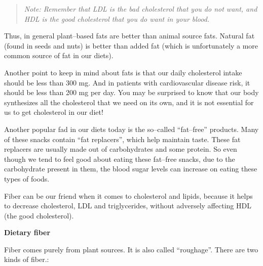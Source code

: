 \begin{quote}
\textit{Note: Remember that LDL is the bad cholesterol that you do not want, and HDL is the good cholesterol that you do want in your blood.}
\end{quote}

Thus, in general plant–based fats are better than animal source fats. Natural fat (found in seeds and nuts) is better than added fat (which is unfortunately a more common source of fat in our diets).

Another point to keep in mind about fats is that our daily cholesterol intake should be less than 300 mg. And in patients with cardiovascular disease risk, it should be less than 200 mg per day. You may be surprised to know that our body synthesizes all the cholesterol that we need on its own, and it is not essential for us to get cholesterol in our diet!

Another popular fad in our diets today is the so–called “fat–free” products. Many of these snacks contain “fat replacers”, which help maintain taste. These fat replacers are usually made out of carbohydrates and some protein. So even though we tend to feel good about eating these fat–free snacks, due to the carbohydrate present in them, the blood sugar levels can increase on eating these types of foods.

Fiber can be our friend when it comes to cholesterol and lipids, because it helps to decrease cholesterol, LDL and triglycerides, without adversely affecting HDL (the good cholesterol).

\noindent\textbf{Dietary fiber}

Fiber comes purely from plant sources. It is also called “roughage”. There are two kinds of fiber.:

